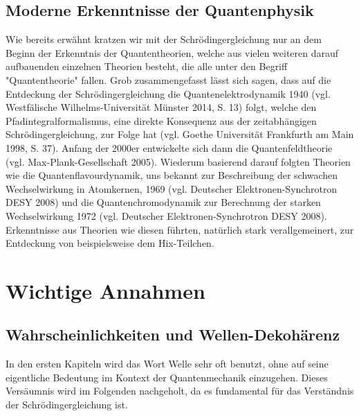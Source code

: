 \documentclass[12pt,oneside, a4paper]{scrbook}
\begin{document}
\section{Moderne Erkenntnisse der Quantenphysik}

Wie bereits erwähnt kratzen wir mit der Schrödingergleichung nur an dem Beginn der Erkenntnis der Quantentheorien, welche aus vielen weiteren darauf aufbauenden einzelnen Theorien besteht, die alle unter den Begriff "Quantentheorie" fallen. Grob zusammengefasst lässt sich sagen, dass auf die Entdeckung der Schrödingergleichung die Quantenelektrodynamik 1940 (vgl. Westfälische Wilhelms-Universität Münster 2014, S. 13) folgt, welche den Pfadintegralformalismus, eine direkte Konsequenz aus der zeitabhängigen Schrödingergleichung, zur Folge hat (vgl. Goethe Universität Frankfurth am Main 1998, S. 37).
Anfang der 2000er entwickelte sich dann die Quantenfeldtheorie (vgl. Max-Plank-Gesellschaft 2005). Wiederum basierend darauf folgten Theorien wie die Quantenflavourdynamik, uns bekannt zur Beschreibung der schwachen Wechselwirkung in Atomkernen, 1969 (vgl. Deutscher Elektronen-Synchrotron DESY 2008) und die Quantenchromodynamik zur Berechnung der starken Wechselwirkung 1972 (vgl. Deutscher Elektronen-Synchrotron DESY 2008). Erkenntnisse aus Theorien wie diesen führten, natürlich stark verallgemeinert, zur Entdeckung von beispielsweise dem Hix-Teilchen.

\chapter{Wichtige Annahmen}

\section{Wahrscheinlichkeiten und Wellen-Dekohärenz}

In den ersten Kapiteln wird das Wort Welle sehr oft benutzt, ohne auf seine eigentliche Bedeutung im Kontext der Quantenmechanik einzugehen. Dieses Versäumnis wird im Folgenden nachgeholt, da es fundamental für das Verständnis der Schrödingergleichung ist.
\end{document}
